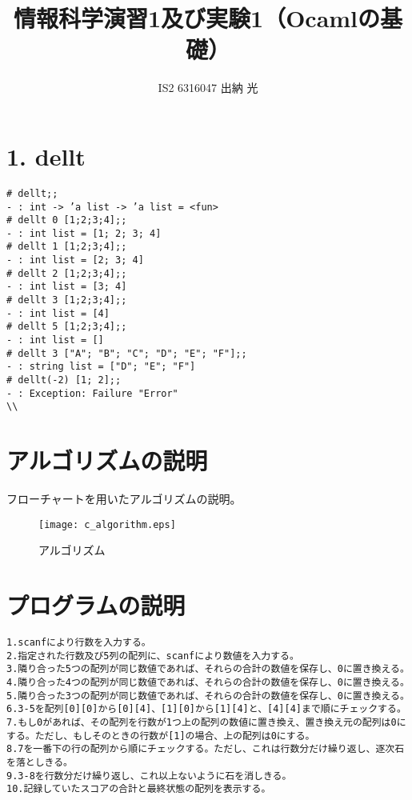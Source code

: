\documentclass{jarticle}
\title{情報科学演習1及び実験1（Ocamlの基礎）}
\author{IS2 6316047 出納 光}
\begin{document}
\maketitle

\section{1. dellt}
\begin{verbatim}
# dellt;;
- : int -> ’a list -> ’a list = <fun> 
# dellt 0 [1;2;3;4];;
- : int list = [1; 2; 3; 4]
# dellt 1 [1;2;3;4];;
- : int list = [2; 3; 4]
# dellt 2 [1;2;3;4];;
- : int list = [3; 4]
# dellt 3 [1;2;3;4];;
- : int list = [4]
# dellt 5 [1;2;3;4];;
- : int list = []
# dellt 3 ["A"; "B"; "C"; "D"; "E"; "F"];;
- : string list = ["D"; "E"; "F"]
# dellt(-2) [1; 2];;
- : Exception: Failure "Error"
\\

\end{verbatim}

\newpage
\section{アルゴリズムの説明}
フローチャートを用いたアルゴリズムの説明。
\begin{figure}[!h]
\begin{center}
\texttt{[image: c\_algorithm.eps]}
\end{center}
\caption{アルゴリズム}
\end{figure}

\newpage
\section{プログラムの説明}
\begin{verbatim}
1.scanfにより行数を入力する。
2.指定された行数及び5列の配列に、scanfにより数値を入力する。
3.隣り合った5つの配列が同じ数値であれば、それらの合計の数値を保存し、0に置き換える。
4.隣り合った4つの配列が同じ数値であれば、それらの合計の数値を保存し、0に置き換える。
5.隣り合った3つの配列が同じ数値であれば、それらの合計の数値を保存し、0に置き換える。
6.3-5を配列[0][0]から[0][4]、[1][0]から[1][4]と、[4][4]まで順にチェックする。
7.もし0があれば、その配列を行数が1つ上の配列の数値に置き換え、置き換え元の配列は0にする。ただし、もしそのときの行数が[1]の場合、上の配列は0にする。
8.7を一番下の行の配列から順にチェックする。ただし、これは行数分だけ繰り返し、逐次石を落としきる。
9.3-8を行数分だけ繰り返し、これ以上ないように石を消しきる。
10.記録していたスコアの合計と最終状態の配列を表示する。
\end{verbatim}
\end{document}
